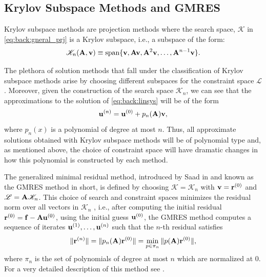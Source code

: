 

\newpage
\subsection{Krylov Subspace Methods and GMRES}
\label{back:itersolvers:krylov}

Krylov subspace methods are projection methods where the search space,
$\mathscr{K}$ in \eqref{eq:back:gneral_prj} is a Krylov subspace, i.e., a
subspace of the form:
\begin{equation}\label{eq:back:krylov}
\mathscr{K}_{n}(\mathbf{A},\mathbf{v})\equiv\text{span}\{\mathbf{v},\mathbf{A}\mathbf{v},\mathbf{A}^2\mathbf{v},\ldots,\mathbf{A}^{n-1}\mathbf{v}\}.
\end{equation}

The plethora of solution methods that fall under the classification of Krylov subspace methods  arise by choosing different subspaces for the constraint space $\mathscr{L}$. Moreover, given the construction of the search space $\mathscr{K}_{n}$, we can see that the approximations to the solution of \eqref{eq:back:linsys} will be of the form
\begin{equation}
\mathbf{u}^{(n)}=\mathbf{u}^{(0)}+p_{n}(\mathbf{A})\mathbf{v},
\end{equation}
where $p_{n}(x)$ is a polynomial of degree at most $n$. Thus, all approximate
solutions obtained with Krylov subspace methods will be of polynomial type and,
as mentioned above, the choice of constraint space will have dramatic changes
in how this polynomial is constructed by each method.

The generalized minimal residual method, introduced by Saad in \cite{Saa86} and known as the GMRES method in short, is defined by choosing $\mathscr{K}=\mathscr{K}_n$ with $\mathbf{v}=\mathbf{r}^{(0)}$ and $\mathscr{L}=\mathbf{A}\mathscr{K}_n$. This choice of search and constraint spaces minimizes the residual norm over all vectors in $\mathscr{K}_n$ \cite{Saa03}, i.e., after computing the initial residual $\mathbf{r}^{(0)}=\mathbf{f}-\mathbf{A}\mathbf{u}^{(0)}$, using the initial guess $\mathbf{u}^{(0)}$, the GMRES method computes a sequence of iterates $\mathbf{u}^{(1)},\ldots,\mathbf{u}^{(n)}$
such that the $n$-th residual satisfies
\begin{equation}
\|\mathbf{r}^{(n)}\|=\|p_{n}(\mathbf{A})\mathbf{r}^{(0)}\|=\min_{p \in \pi_n}\|p(\mathbf{A})\mathbf{r}^{(0)}\|,
\end{equation}
where $\pi_n$ is the set of polynomials of degree at most $n$ which are
normalized at $0$. For a very detailed description of this method see \cite{LieStr12}.

